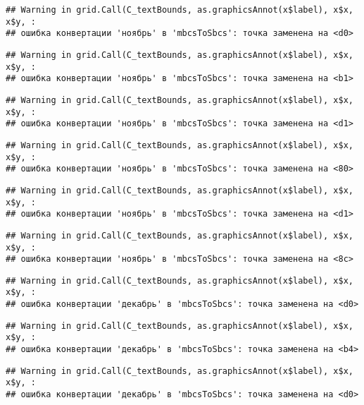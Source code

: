 \documentclass[
]{article}
\begin{document}
\begin{verbatim}
## Warning in grid.Call(C_textBounds, as.graphicsAnnot(x$label), x$x, x$y, :
## ошибка конвертации 'ноябрь' в 'mbcsToSbcs': точка заменена на <d0>
\end{verbatim}

\begin{verbatim}
## Warning in grid.Call(C_textBounds, as.graphicsAnnot(x$label), x$x, x$y, :
## ошибка конвертации 'ноябрь' в 'mbcsToSbcs': точка заменена на <b1>
\end{verbatim}

\begin{verbatim}
## Warning in grid.Call(C_textBounds, as.graphicsAnnot(x$label), x$x, x$y, :
## ошибка конвертации 'ноябрь' в 'mbcsToSbcs': точка заменена на <d1>
\end{verbatim}

\begin{verbatim}
## Warning in grid.Call(C_textBounds, as.graphicsAnnot(x$label), x$x, x$y, :
## ошибка конвертации 'ноябрь' в 'mbcsToSbcs': точка заменена на <80>
\end{verbatim}

\begin{verbatim}
## Warning in grid.Call(C_textBounds, as.graphicsAnnot(x$label), x$x, x$y, :
## ошибка конвертации 'ноябрь' в 'mbcsToSbcs': точка заменена на <d1>
\end{verbatim}

\begin{verbatim}
## Warning in grid.Call(C_textBounds, as.graphicsAnnot(x$label), x$x, x$y, :
## ошибка конвертации 'ноябрь' в 'mbcsToSbcs': точка заменена на <8c>
\end{verbatim}

\begin{verbatim}
## Warning in grid.Call(C_textBounds, as.graphicsAnnot(x$label), x$x, x$y, :
## ошибка конвертации 'декабрь' в 'mbcsToSbcs': точка заменена на <d0>
\end{verbatim}

\begin{verbatim}
## Warning in grid.Call(C_textBounds, as.graphicsAnnot(x$label), x$x, x$y, :
## ошибка конвертации 'декабрь' в 'mbcsToSbcs': точка заменена на <b4>
\end{verbatim}

\begin{verbatim}
## Warning in grid.Call(C_textBounds, as.graphicsAnnot(x$label), x$x, x$y, :
## ошибка конвертации 'декабрь' в 'mbcsToSbcs': точка заменена на <d0>
\end{verbatim}
\end{document}

